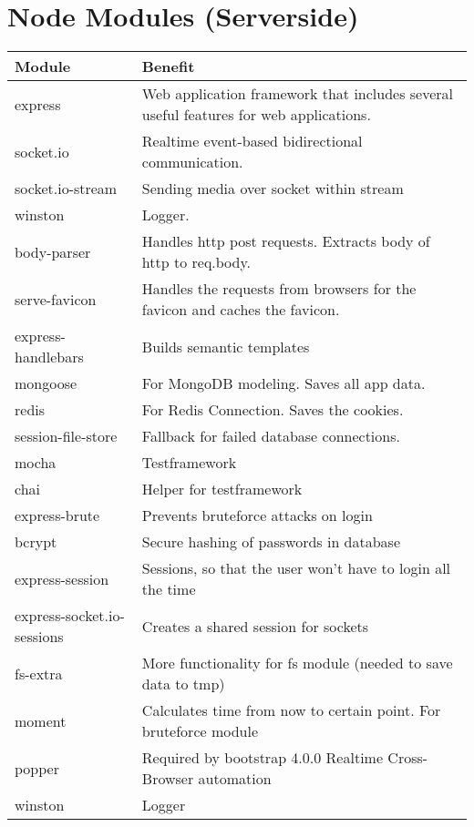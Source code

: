 \documentclass[10pt,a4paper,landscape]{article}
\begin{document}
\section{Node Modules (Serverside)}
\begin{tabularx}{\textwidth}{ll}
    \textbf{Module} & \textbf{Benefit}               \\
    \toprule
    express         & Web application framework that includes several useful features for web applications. \\ 
    \midrule
    socket.io       & Realtime event-based bidirectional communication. \\
    \midrule
    socket.io-stream & Sending media over socket within stream\\
    \midrule
    winston         & Logger. \\
    \midrule
    body-parser     & Handles http post requests. Extracts body of http to req.body. \\
    \midrule
    serve-favicon   & Handles the requests from browsers for the favicon and caches the favicon. \\
    \midrule
    express-handlebars & Builds semantic templates \\
    \midrule
    mongoose        & For MongoDB modeling. Saves all app data. \\
    \midrule
    redis           & For Redis Connection. Saves the cookies. \\
    \midrule
    session-file-store & Fallback for failed database connections.\\
    \midrule
    mocha           & Testframework \\
    \midrule
    chai            & Helper for testframework \\
    \midrule
    express-brute   & Prevents bruteforce attacks on login \\
    \midrule
    bcrypt          & Secure hashing of passwords in database \\
    \midrule
    express-session & Sessions, so that the user won't have to login all the time\\
    \midrule
    express-socket.io-sessions & Creates a shared session for sockets\\
    \midrule
    fs-extra        & More functionality for fs module (needed to save data to tmp)\\
    \midrule
    moment          & Calculates time from now to certain point. For bruteforce module\\
    \midrule
    popper          & Required by bootstrap 4.0.0 Realtime Cross-Browser automation\\
    \midrule
    winston         & Logger\\
    \bottomrule
\end{tabularx}
\end{document}
